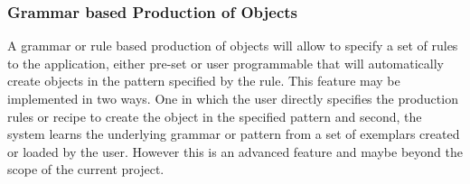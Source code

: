 \subsubsection{Grammar based Production of Objects}
\label{Design:Interaction:GrammarBasedProduction}
A grammar or rule based production of objects will allow to specify a set of rules to the application, either pre-set or user programmable
that will automatically create objects in the pattern specified by the rule. This feature may be implemented in two ways. One in which the user 
directly specifies the production rules or recipe to create the object in the specified pattern and second, the system learns the underlying 
grammar or pattern from a set of exemplars created or loaded by the user. However this is an advanced feature and maybe beyond the scope of the
current project.

